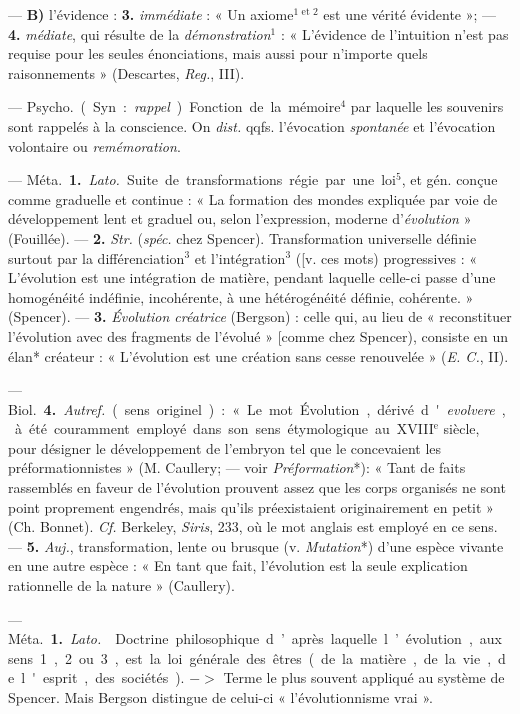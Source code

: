 \begin{itemize}[leftmargin=1cm, label=, itemsep=1pt]
— {\bf B)} l'évidence : {\bf 3.} {\it immédiate} : « Un axiome$^\text{1 et 2}$
est une vérité évidente »; — {\bf 4.} {\it médiate}, qui résulte de
la {\it démonstration}$^1$ : « L'évidence de
l'intuition n’est pas requise pour les
seules énonciations, mais aussi pour
n'importe quels raisonnements »
(Descartes, {\it Reg.}, III).

 — \si{Psycho.} (Syn. : {\it rappel}).
Fonction de la mémoire$^4$ par laquelle
les souvenirs sont rappelés à la conscience. On {\it dist.} qqfs. l'évocation
{\it spontanée} et l’évocation volontaire
ou {\it remémoration}.

 — \si{Méta.} {\bf 1.} {\it Lato.} Suite de
transformations régie par une loi$^5$,
et gén. conçue comme graduelle et
continue : « La formation des mondes
expliquée par voie de développement lent et graduel ou, selon
l'expression, moderne d'{\it évolution} »
(Fouillée). — {\bf 2.} {\it Str.} ({\it spéc.} chez
Spencer). Transformation universelle définie surtout par la différenciation$^3$ et l'intégration$^3$ ([v. ces
mots) progressives : « L’évolution
est une intégration de matière, pendant laquelle celle-ci passe d’une
homogénéité indéfinie, incohérente,
à une hétérogénéité définie, cohérente. » (Spencer). — {\bf 3.}
{\it Évolution créatrice} (Bergson) : celle qui, au
lieu de « reconstituer l’évolution
avec des fragments de l’évolué »
[comme chez Spencer), consiste en
un élan* créateur : « L'évolution
est une création sans cesse renouvelée » ({\it E. C.}, II).

— \si{Biol.} {\bf 4.} {\it Autref.} (sens originel) :
« Le mot Évolution, dérivé d'{\it evolvere}, à été couramment employé
dans son sens étymologique au {\footnotesize XVIII}$^\text{e}$ siècle,
pour désigner le développement de l'embryon tel que le
concevaient les préformationnistes »
(M. Caullery; — voir {\it Préformation}*):
« Tant de faits rassemblés en faveur
de l’évolution prouvent assez que
les corps organisés ne sont point
proprement engendrés, mais qu'ils
préexistaient originairement en
petit » (Ch. Bonnet). {\it Cf.} Berkeley,
{\it Siris}, 233, où le mot anglais est
employé en ce sens. — {\bf 5.} {\it Auj.}, transformation, lente ou brusque (v. {\it Mutation}*) d’une espèce vivante en une
autre espèce : « En tant que fait,
l’évolution est la seule explication
rationnelle de la nature » (Caullery).

 — \si{Méta.}
{\bf 1.} {\it Lato.}  Doctrine philosophique
d’après laquelle l’évolution, aux sens 1, 2 ou 3, est la loi
générale des êtres (de la matière,
de la vie, de l'esprit, des sociétés).
$->$ Terme le plus souvent appliqué
au système de Spencer. Mais Bergson
distingue de celui-ci « l’évolutionnisme vrai ».


\end{itemize}
